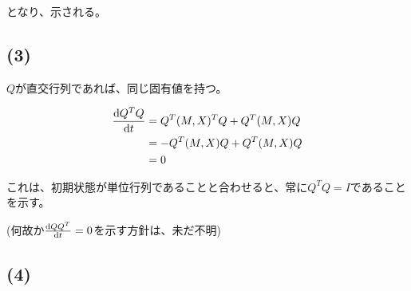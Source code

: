 \documentclass[a4paper, 10pt, dvipdfmx]{jlreq}
\begin{document}
となり、示される。

\subsection*{(3)}

$Q$が直交行列であれば、同じ固有値を持つ。

\begin{align*}
    \dv{Q^TQ}{t} & =Q^T(M,X)^TQ+Q^T(M,X)Q \\
                 & =-Q^T(M,X)Q+Q^T(M,X)Q  \\
                 & =0
\end{align*}

これは、初期状態が単位行列であることと合わせると、常に$Q^TQ=I$であることを示す。

(何故か$\dv{QQ^T}{t}=0$を示す方針は、未だ不明)

\subsection*{(4)}
\end{document}
